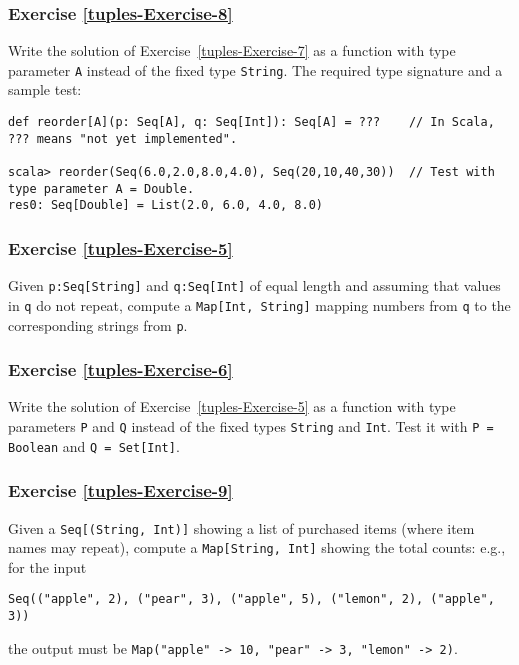 \subsubsection{Exercise \label{tuples-Exercise-8}\ref{tuples-Exercise-8}}

Write the solution of Exercise~\ref{tuples-Exercise-7} as a function
with type parameter \lstinline!A! instead of the fixed type \lstinline!String!.
The required type signature and a sample test:
\begin{lstlisting}
def reorder[A](p: Seq[A], q: Seq[Int]): Seq[A] = ???    // In Scala, ??? means "not yet implemented".

scala> reorder(Seq(6.0,2.0,8.0,4.0), Seq(20,10,40,30))  // Test with type parameter A = Double.
res0: Seq[Double] = List(2.0, 6.0, 4.0, 8.0)
\end{lstlisting}


\subsubsection{Exercise \label{tuples-Exercise-5}\ref{tuples-Exercise-5}}

Given \lstinline!p:Seq[String]! and \lstinline!q:Seq[Int]! of equal
length and assuming that values in \lstinline!q! do not repeat, compute
a \lstinline!Map[Int, String]! mapping numbers from \lstinline!q!
to the corresponding strings from \lstinline!p!.

\subsubsection{Exercise \label{tuples-Exercise-6}\ref{tuples-Exercise-6}}

Write the solution of Exercise~\ref{tuples-Exercise-5} as a function
with type parameters \lstinline!P! and \lstinline!Q! instead of
the fixed types \lstinline!String! and \lstinline!Int!. Test it
with \lstinline!P = Boolean! and \lstinline!Q = Set[Int]!.

\subsubsection{Exercise \label{tuples-Exercise-9}\ref{tuples-Exercise-9}}

Given a \lstinline!Seq[(String, Int)]! showing a list of purchased
items (where item names may repeat), compute a \lstinline!Map[String, Int]!
showing the total counts: e.g., for the input 
\begin{lstlisting}
Seq(("apple", 2), ("pear", 3), ("apple", 5), ("lemon", 2), ("apple", 3))
\end{lstlisting}
the output must be \lstinline!Map("apple" -> 10, "pear" -> 3, "lemon" -> 2)!.

